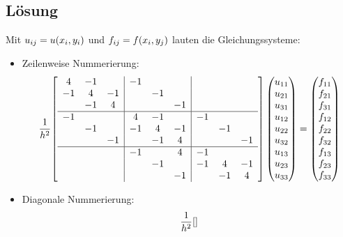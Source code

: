 \documentclass{exercise}
\begin{document}
    \subsection*{Lösung}
    Mit \(u_{ij} = u\parentheses*{x_i, y_i}\) und \(f_{ij} = f\parentheses*{x_i, y_j}\) lauten die Gleichungssysteme:
    \begin{itemize}
        \item Zeilenweise Nummerierung:
        \[
            \frac{1}{h^2}\brackets*{\begin{array}{ccc|ccc|ccc}
                4 & -1 & & -1 & & & & &\\
                -1 & 4 & -1 & & -1 & & & &\\
                & -1 & 4 & & & -1 & & &\\
                \hline
                -1 & & & 4 & -1 & & -1 & &\\
                & -1 & & -1 & 4 & -1 & & -1 &\\
                & & -1 & & -1 & 4 & & & -1\\
                \hline
                & & & -1 & & 4 & -1 &\\
                & & & & -1 & & -1 & 4 & -1\\
                & & & & & -1 & & -1 & 4
            \end{array}}\begin{pmatrix}
                u_{11}\\u_{21}\\u_{31}\\u_{12}\\u_{22}\\u_{32}\\u_{13}\\u_{23}\\u_{33}
            \end{pmatrix} = \begin{pmatrix}
                f_{11}\\f_{21}\\f_{31}\\f_{12}\\f_{22}\\f_{32}\\f_{13}\\f_{23}\\f_{33}
            \end{pmatrix}
        \]
        \item Diagonale Nummerierung:
        \[
            \frac{1}{h^2}\brackets*{\begin{array}{c|cc|ccc|cc|c}

\end{array}}\]
\end{itemize}
\end{document}

